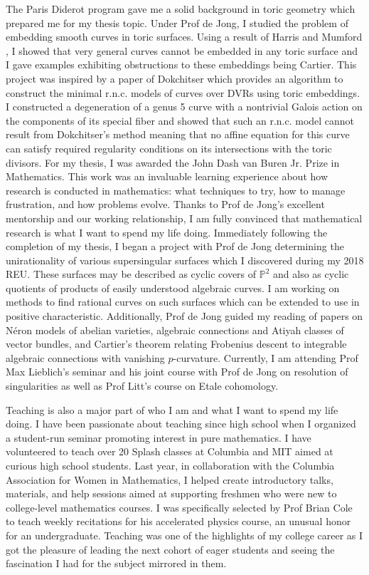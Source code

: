 \documentclass[11pt]{article}
\begin{document}
The Paris Diderot program gave me a solid background in toric geometry which prepared me for my thesis topic. Under Prof de Jong, I studied the problem of embedding smooth curves in toric surfaces. Using a result of Harris and Mumford , I showed that very general curves cannot be embedded in any toric surface and I gave examples exhibiting obstructions to these embeddings being Cartier. This project was inspired by a paper of Dokchitser  which provides an algorithm to construct the minimal r.n.c. models of curves over DVRs using toric embeddings. I constructed a degeneration of a genus 5 curve with a nontrivial Galois action on the components of its special fiber and showed that such an r.n.c. model cannot result from Dokchitser's method meaning that no affine equation for this curve can satisfy required regularity conditions on its intersections with the toric divisors. For my thesis, I was awarded the John Dash van Buren Jr. Prize in Mathematics. This work was an invaluable learning experience about how research is conducted in mathematics: what techniques to try, how to manage frustration, and how problems evolve. Thanks to Prof de Jong’s excellent mentorship and our working relationship, I am fully convinced that mathematical research is what I want to spend my life doing. Immediately following the completion of my thesis, I began a project with Prof de Jong determining the unirationality of various supersingular surfaces which I discovered during my 2018 REU. These surfaces may be described as cyclic covers of $\mathbb{P}^2$ and also as cyclic quotients of products of easily understood algebraic curves. I am working on methods to find rational curves on such surfaces which can be extended to use in positive characteristic. Additionally, Prof de Jong guided my reading of papers on N\'{e}ron models of abelian varieties, algebraic connections and Atiyah classes of vector bundles, and Cartier's theorem relating Frobenius descent to integrable algebraic connections with vanishing $p$-curvature. Currently, I am attending Prof Max Lieblich's seminar and his joint course with Prof de Jong on resolution of singularities as well as Prof Litt's course on Etale cohomology.
\par
Teaching is also a major part of who I am and what I want to spend my life doing. I have been passionate about teaching since high school when I organized a student-run seminar promoting interest in pure mathematics. I have volunteered to teach over 20 Splash classes at Columbia and MIT aimed at curious high school students. Last year, in collaboration with the Columbia Association for Women in Mathematics, I helped create introductory talks, materials, and help sessions aimed at supporting freshmen who were new to college-level mathematics courses. I was specifically selected by Prof Brian Cole to teach weekly recitations for his accelerated physics course, an unusual honor for an undergraduate. Teaching was one of the highlights of my college career as I got the pleasure of leading the next cohort of eager students and seeing the fascination I had for the subject mirrored in them.
\end{document}
